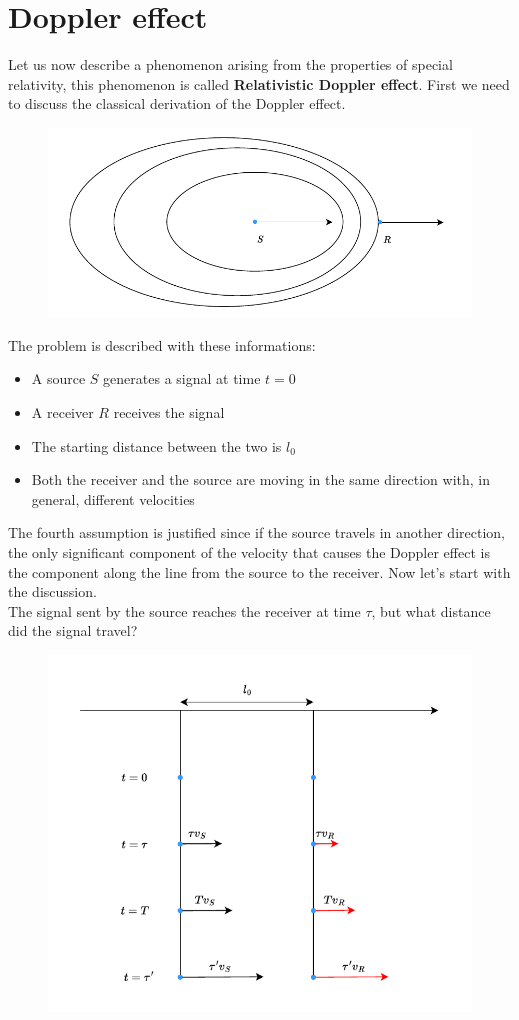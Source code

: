 \section{Doppler effect}
Let us now describe a phenomenon arising from the properties of special relativity, this phenomenon is called \textbf{Relativistic Doppler effect}. First we need to discuss the classical derivation of the Doppler effect.
\begin{figure}[H]
  \centering
  \includegraphics[width=1\linewidth]{res/svg/classical_doppler_diagram.drawio}
\end{figure}
The problem is described with these informations:
\begin{itemize}
  \item A source $S$ generates a signal at time $t=0$
  \item A receiver $R$ receives the signal
  \item The starting distance between the two is $l_0$
  \item Both the receiver and the source are moving in the same direction with, in general, different velocities
\end{itemize}
The fourth assumption is justified since if the source travels in another direction, the only significant component of the velocity that causes the Doppler effect is the component along the line from the source to the receiver.
Now let's start with the discussion.\\
The signal sent by the source reaches the receiver at time $\tau$, but what distance did the signal travel?\\
\begin{figure}[H]
  \centering
  \includegraphics[width=0.8\linewidth]{res/svg/classical_doppler_distances.drawio}
\end{figure}
